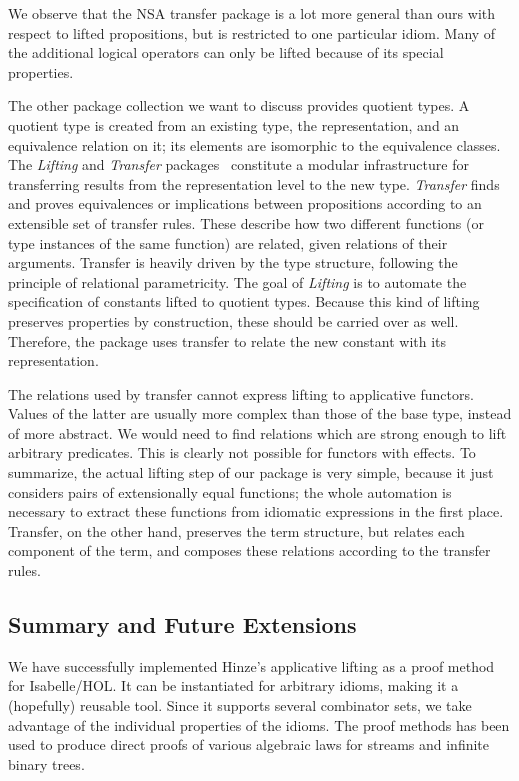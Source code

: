 We observe that the NSA transfer package is a lot more general than ours with
respect to lifted propositions, but is restricted to one particular idiom.
Many of the additional logical operators can only be lifted because of its
special properties.

The other package collection we want to discuss provides quotient types.
A quotient type is created from an existing type, the representation, and an
equivalence relation on it; its elements are isomorphic to the equivalence
classes.
The \emph{Lifting} and \emph{Transfer} packages~\cite{huffman13} constitute a
modular infrastructure for transferring results from the representation level
to the new type.
\emph{Transfer} finds and proves equivalences or implications between
propositions according to an extensible set of transfer rules.
These describe how two different functions (or type instances of the same
function) are related, given relations of their arguments.
Transfer is heavily driven by the type structure, following the principle of
relational parametricity.
The goal of \emph{Lifting} is to automate the specification of constants lifted
to quotient types.
Because this kind of lifting preserves properties by construction, these should
be carried over as well.
Therefore, the package uses transfer to relate the new constant with its
representation.

The relations used by transfer cannot express lifting to applicative functors.
Values of the latter are usually more complex than those of the base type,
instead of more abstract.
We would need to find relations which are strong enough to lift arbitrary
predicates.
This is clearly not possible for functors with effects.
To summarize, the actual lifting step of our package is very simple, because it
just considers pairs of extensionally equal functions;
the whole automation is necessary to extract these functions from idiomatic
expressions in the first place.
Transfer, on the other hand, preserves the term structure, but relates each
component of the term, and composes these relations according to the
transfer rules.


\subsection{Summary and Future Extensions}\label{subsec:summary-future}

We have successfully implemented Hinze's applicative lifting as a proof method
for Isabelle/HOL.
It can be instantiated for arbitrary idioms, making it a (hopefully) reusable
tool.
Since it supports several combinator sets, we take advantage of the individual
properties of the idioms.
The proof methods has been used to produce direct proofs of various algebraic
laws for streams and infinite binary trees.

